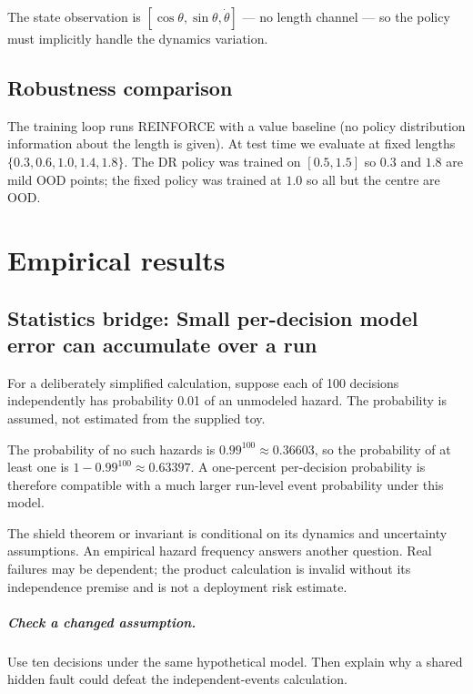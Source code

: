 \documentclass[11pt,oneside]{scrbook}
\begin{document}
The state observation is $[\cos\theta, \sin\theta, \dot\theta]$ --- no
length channel --- so the policy must implicitly handle the dynamics
variation.

\section{Robustness comparison}

The training loop runs REINFORCE with a value baseline (no policy
distribution information about the length is given). At test time we
evaluate at fixed lengths $\{0.3, 0.6, 1.0, 1.4, 1.8\}$. The DR policy was
trained on $[0.5, 1.5]$ so $0.3$ and $1.8$ are mild OOD points; the fixed
policy was trained at $1.0$ so all but the centre are OOD.

\chapter{Empirical results}

\section{Statistics bridge: Small per-decision model error can accumulate over a run}
\begin{example}
For a deliberately simplified calculation, suppose each of 100 decisions independently has probability 0.01 of an unmodeled hazard. The probability is assumed, not estimated from the supplied toy.

The probability of no such hazards is $0.99^{100}\approx0.36603$, so the probability of at least one is $1-0.99^{100}\approx0.63397$. A one-percent per-decision probability is therefore compatible with a much larger run-level event probability under this model.
\end{example}
The shield theorem or invariant is conditional on its dynamics and uncertainty assumptions. An empirical hazard frequency answers another question. Real failures may be dependent; the product calculation is invalid without its independence premise and is not a deployment risk estimate.

\paragraph{Check a changed assumption.} Use ten decisions under the same hypothetical model. Then explain why a shared hidden fault could defeat the independent-events calculation.
\end{document}
